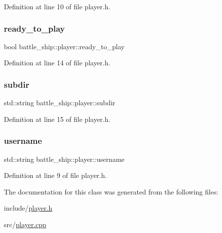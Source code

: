 Definition at line 10 of file player.\+h.

\mbox{\label{classbattle__ship_1_1player_a48a3f8c692c7ea1def384c39b9b65e85}} 
\subsubsection{\texorpdfstring{ready\+\_\+to\+\_\+play}{ready\_to\_play}}
{\footnotesize\ttfamily bool battle\+\_\+ship\+::player\+::ready\+\_\+to\+\_\+play\hspace{0.3cm}{\ttfamily [protected]}}



Definition at line 14 of file player.\+h.

\mbox{\label{classbattle__ship_1_1player_a5cb155ee3d722244c44bf71e5e2440c4}} 
\subsubsection{\texorpdfstring{subdir}{subdir}}
{\footnotesize\ttfamily std\+::string battle\+\_\+ship\+::player\+::subdir\hspace{0.3cm}{\ttfamily [protected]}}



Definition at line 15 of file player.\+h.

\mbox{\label{classbattle__ship_1_1player_aed786567891bcafecb8610e12fb5d413}} 
\subsubsection{\texorpdfstring{username}{username}}
{\footnotesize\ttfamily std\+::string battle\+\_\+ship\+::player\+::username\hspace{0.3cm}{\ttfamily [protected]}}



Definition at line 9 of file player.\+h.



The documentation for this class was generated from the following files\+:\begin{DoxyCompactItemize}
\item 
include/\hyperlink{player_8h}{player.\+h}\item 
src/\hyperlink{player_8cpp}{player.\+cpp}\end{DoxyCompactItemize}
